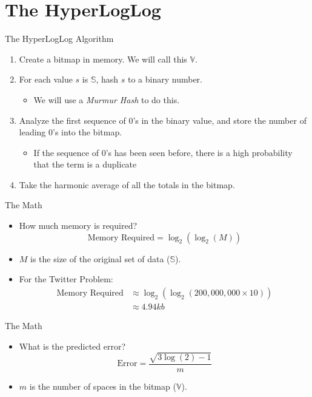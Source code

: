 \documentclass{beamer}
\begin{document}
\section{The HyperLogLog}
\begin{frame}{The HyperLogLog Algorithm}
\begin{enumerate}
\item Create a bitmap in memory. We will call this $\mathbb{V}$.
\pause
\item For each value $s$ is $\mathbb{S}$, hash $s$ to a binary number.
\pause
\begin{itemize}
\item We will use a \textit{Murmur Hash} to do this.
\end{itemize}
\pause
\item Analyze the first sequence of 0's in the binary value, and store the number of leading 0's into the bitmap.
\begin{itemize}
\item If the sequence of 0's has been seen before, there is a high probability that the term is a duplicate
\end{itemize}
\pause
\item Take the harmonic average of all the totals in the bitmap.
\end{enumerate}
\end{frame}

\begin{frame}{The Math}
\begin{itemize}
\item How much memory is required?
\pause
\[
\text{Memory Required} = \log_{2}{(\log_{2}{(M)})}
\]
\pause
\item $M$ is the size of the original set of data ($\mathbb{S}$).
\pause
\item For the Twitter Problem:
\pause
\begin{align*}
\text{Memory Required} &\approx \log_{2}{(\log_{2}{(200,000,000 \times 10)})}\\
&\approx 4.94 kb
\end{align*}
\end{itemize}
\end{frame}

\begin{frame}{The Math}
\begin{itemize}
\item What is the predicted error?
\pause
\[
\text{Error} = \frac{\sqrt{3\log{(2)} - 1}}{m}
\]
\pause
\item $m$ is the number of spaces in the bitmap ($\mathbb{V}$).
\end{itemize}
\end{frame}
\end{document}

